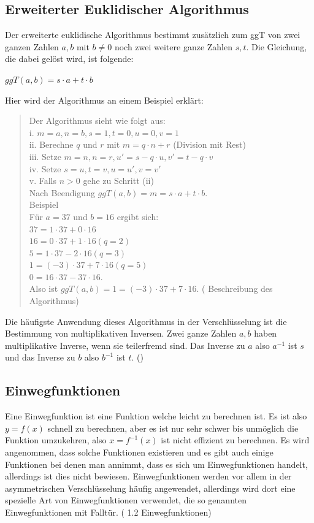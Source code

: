 \documentclass[a4paper,12pt,titlepage]{article}
\begin{document}
\subsection{Erweiterter Euklidischer Algorithmus}\label{exteuk}
Der erweiterte euklidische Algorithmus bestimmt zusätzlich zum ggT von zwei ganzen Zahlen $a,b$ mit $b \neq 0$ noch zwei weitere ganze Zahlen $s,t$. Die Gleichung, die dabei gelöst wird, ist folgende:
\begin{center}
$ggT(a,b) = s \cdot a + t \cdot b$
\end{center}
Hier wird der Algorithmus an einem Beispiel erklärt:
\begin{quote}
\glqq Der Algorithmus sieht wie folgt aus:  \\
i. $m = a, n = b, s = 1, t = 0, u = 0, v = 1$ \\
ii. Berechne $q$ und $r$ mit $m = q\cdot n + r$ (Division mit Rest) \\
iii. Setze $m = n, n = r, u'=s - q \cdot u, v'= t-q \cdot v$\\
iv. Setze $s=u, t=v,u=u',v=v'$ \\
v. Falls $n>0$ gehe zu Schritt (ii) \\
Nach Beendigung $ggT(a,b) = m = s \cdot a + t \cdot b$. \\[1\baselineskip]

Beispiel\\
Für $a = 37$ und $b = 16$ ergibt sich: \\
$37 = 1 \cdot 37 + 0 \cdot 16$\\
$16 = 0 \cdot 37 + 1 \cdot 16 (q=2)$\\
$5 = 1 \cdot 37 - 2 \cdot 16 (q=3)$\\
$1 = (-3) \cdot 37 + 7 \cdot 16 (q=5)$\\
$0 = 16 \cdot 37 - 37 \cdot 16$.\\
Also ist $ggT(a,b) = 1 = (-3) \cdot 37 + 7 \cdot 16$.\grqq{} (\cite{exteuk} Beschreibung des Algorithmus)
\end{quote}
Die häufigste Anwendung dieses Algorithmus in der Verschlüsselung ist die Bestimmung von multiplikativen Inversen. Zwei ganze Zahlen $a, b$ haben multiplikative Inverse, wenn sie teilerfremd sind.
Das Inverse zu $a$ also $a^{-1}$ ist $s$ und das Inverse zu $b$ also $b^{-1}$ ist $t$. (\cite{exteuk})

\subsection{Einwegfunktionen}
Eine Einwegfunktion ist eine Funktion welche leicht zu berechnen ist. Es ist also $y = f(x)$ schnell zu  berechnen, aber es ist nur sehr schwer bis unmöglich die Funktion umzukehren, also $x = f^{-1}(x)$ ist nicht effizient zu berechnen. Es wird angenommen, dass solche Funktionen existieren und es gibt auch einige Funktionen bei denen man annimmt, dass es sich um Einwegfunktionen handelt, allerdings ist dies nicht bewiesen. Einwegfunktionen werden vor allem in der asymmetrischen Verschlüsselung häufig angewendet, allerdings wird dort eine spezielle Art von Einwegfunktionen verwendet, die so genannten Einwegfunktionen mit Falltür. (\cite{oneway_lukas} 1.2 Einwegfunktionen)
\end{document}
